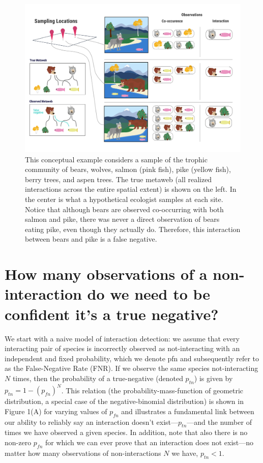 \documentclass[11pt]{article}
\makeatletter
\def\maxwidth{\ifdim\Gin@nat@width>\linewidth\linewidth
\else\Gin@nat@width\fi}
\let\Oldincludegraphics\includegraphics
\renewcommand{\includegraphics}[1]{\Oldincludegraphics[width=\maxwidth]{#1}}
\makeatother
\begin{document}
\begin{figure}
\hypertarget{fig:concept}{%
\centering
\includegraphics{./figures/concept.png}
\caption{This conceptual example considers a sample of the trophic
community of bears, wolves, salmon (pink fish), pike (yellow fish),
berry trees, and aspen trees. The true metaweb (all realized
interactions across the entire spatial extent) is shown on the left. In
the center is what a hypothetical ecologist samples at each site. Notice
that although bears are observed co-occurring with both salmon and pike,
there was never a direct observation of bears eating pike, even though
they actually do. Therefore, this interaction between bears and pike is
a false negative.}\label{fig:concept}
}
\end{figure}

\hypertarget{how-many-observations-of-a-non-interaction-do-we-need-to-be-confident-its-a-true-negative}{%
\section{How many observations of a non-interaction do we need to be
confident it's a true
negative?}\label{how-many-observations-of-a-non-interaction-do-we-need-to-be-confident-its-a-true-negative}}

We start with a naive model of interaction detection: we assume that
every interacting pair of species is incorrectly observed as
not-interacting with an independent and fixed probability, which we
denote pfn and subsequently refer to as the False-Negative Rate (FNR).
If we observe the same species not-interacting \(N\) times, then the
probability of a true-negative (denoted \(p_{tn}\)) is given by
\(p_{tn}=1-(p_{fn})^N\). This relation (the probability-mass-function of
geometric distribution, a special case of the negative-binomial
distribution) is shown in Figure 1(A) for varying values of \(p_{fn}\)
and illustrates a fundamental link between our ability to reliably say
an interaction doesn't exist---\(p_{tn}\)---and the number of times we
have observed a given species. In addition, note that also there is no
non-zero \(p_{fn}\) for which we can ever prove that an interaction does
not exist---no matter how many observations of non-interactions \(N\) we
have, \(p_{tn}<1\).
\end{document}
